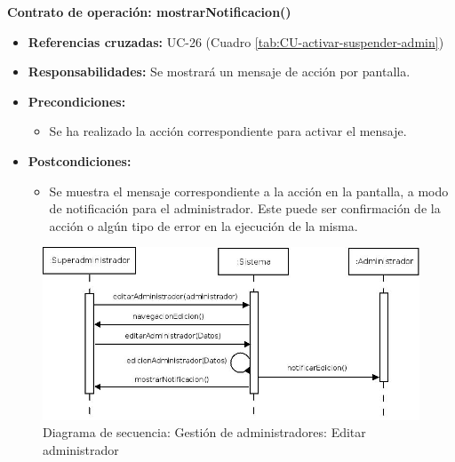 \textbf{Contrato de operación: mostrarNotificacion()}
\begin{itemize}
\item \textbf{Referencias cruzadas:} UC-26 (Cuadro \ref{tab:CU-activar-suspender-admin})
\item \textbf{Responsabilidades:} Se mostrará un mensaje de acción por pantalla.
\item \textbf{Precondiciones:} 
 \begin{itemize}
\item Se ha realizado la acción correspondiente para activar el mensaje.
\end {itemize}
\item \textbf{Postcondiciones:} 
 \begin{itemize}
\item Se muestra el mensaje correspondiente a la acción en la pantalla, a modo de notificación para el administrador. Este puede ser confirmación de la acción o algún tipo de error en la ejecución de la misma.
\end {itemize}
\end {itemize}


\vspace{7mm}
\dotfill
\vspace{7mm}

\begin{figure}[h!]
\centering
  \includegraphics[scale=.50]{img/secuencias/gestion-administradores-editar-administrador.jpeg}
  \caption{Diagrama de secuencia: Gestión de administradores: Editar administrador}
  \label{fig:secuencia-gestion-administradores-editar-administrador}
\end{figure}

